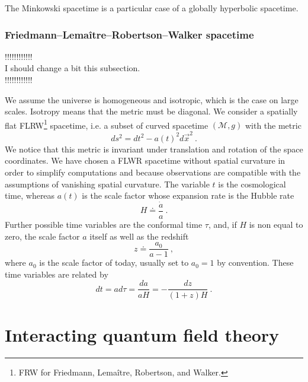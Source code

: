 \documentclass[10pt]{book}
\newcommand{\Mcal}{\mathcal{M}}
\theoremstyle{break}
\begin{document}
The Minkowski spacetime is a particular case of a globally hyperbolic spacetime. 


\subsection{Friedmann--Lemaître--Robertson--Walker spacetime}

!!!!!!!!!!!!\\
I should change a bit this subsection.\\
!!!!!!!!!!!!


\bigskip

We assume the universe is homogeneous and isotropic, which is the case on large scales. Isotropy means that the metric must be diagonal. We consider a spatially flat FLRW\footnote{FRW for Friedmann, Lemaître, Robertson, and Walker.} spacetime, i.e. a subset of curved spacetime $(\Mcal,g)$ with the metric
%
\begin{equation*}
ds^2 = dt^2 - a(t)^2 d\vec{x}^2 \ .
\end{equation*}
%
We notice that this metric is invariant under translation and rotation of the space coordinates. We have chosen a FLWR spacetime without spatial curvature in order to simplify computations and because observations are compatible with the assumptions of vanishing spatial curvature. The variable $t$ is the cosmological time, whereas $a(t)$ is the scale factor whose expansion rate is the Hubble rate
%
\begin{equation*}
 H \doteq \frac{\dot{a}}{a} \ . 
\end{equation*}
%
Further possible time variables are the conformal time $\tau$, and, if $H$ is non equal to zero, the scale factor $a$ itself as well as the redshift
%
\begin{equation*}
z \doteq \frac{a_0}{a-1} \ ,
\end{equation*}
%
where $a_0$ is the scale factor of today, usually set to $a_0 = 1$ by convention. These time variables are related by
%
\begin{equation*}
dt = a d\tau = \frac{da}{aH} = -\frac{dz}{(1+z)H} \ . 
\end{equation*}


\chapter{Interacting quantum field theory}
\end{document}
